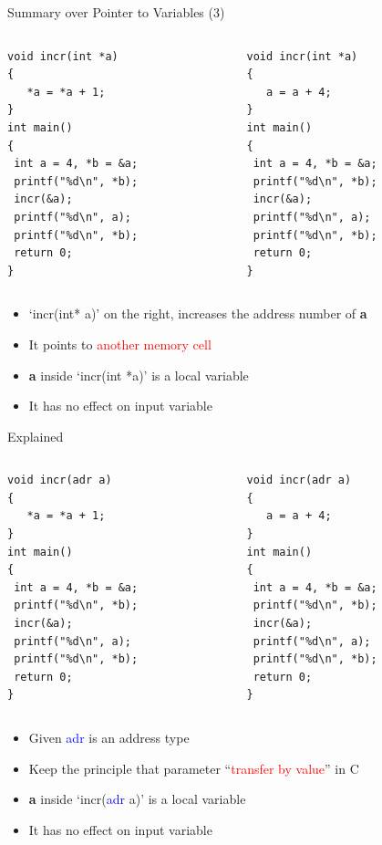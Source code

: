 \begin{frame}[fragile]{Summary over Pointer to Variables (3)}
\vspace{-0.25in}
\begin{columns}
\begin{column}{0.4\linewidth}
\begin{lstlisting}
void incr(int *a)
{
   *a = *a + 1;
}
int main()
{
 int a = 4, *b = &a;
 printf("%d\n", *b);
 incr(&a);
 printf("%d\n", a);
 printf("%d\n", *b);
 return 0;
}
\end{lstlisting}
\end{column}
\begin{column}{0.45\linewidth}
\begin{lstlisting}
void incr(int *a)
{
   a = a + 4;
}
int main()
{
 int a = 4, *b = &a;
 printf("%d\n", *b);
 incr(&a);
 printf("%d\n", a);
 printf("%d\n", *b);
 return 0;
}
\end{lstlisting}
\end{column}
\end{columns}
\begin{itemize}
	\item {`incr(int* a)' on the right, increases the address number of \textbf{a}}
    \item {It points to \textcolor{red}{another memory cell}}
    \item {\textbf{a} inside `incr(int *a)' is a local variable}
    \item {It has no effect on input variable}
\end{itemize}
\end{frame}

\begin{frame}[fragile]{Explained}
\vspace{-0.25in}
\begin{columns}
\begin{column}{0.4\linewidth}
\begin{lstlisting}
void incr(adr a)
{
   *a = *a + 1;
}
int main()
{
 int a = 4, *b = &a;
 printf("%d\n", *b);
 incr(&a);
 printf("%d\n", a);
 printf("%d\n", *b);
 return 0;
}
\end{lstlisting}
\end{column}
\begin{column}{0.45\linewidth}
\begin{lstlisting}
void incr(adr a)
{
   a = a + 4;
}
int main()
{
 int a = 4, *b = &a;
 printf("%d\n", *b);
 incr(&a);
 printf("%d\n", a);
 printf("%d\n", *b);
 return 0;
}
\end{lstlisting}
\end{column}
\end{columns}
\begin{itemize}
	\item {Given \textcolor{blue}{adr} is an address type}
    \item {Keep the principle that parameter ``\textcolor{red}{transfer by value}'' in C}
    \item {\textbf{a} inside `incr(\textcolor{blue}{adr} a)' is a local variable}
    \item {It has no effect on input variable}
\end{itemize}
\end{frame}

